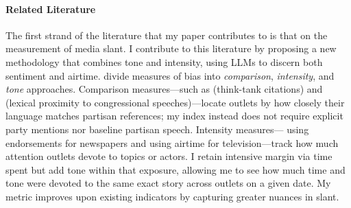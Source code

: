 \documentclass[12pt]{article}
\begin{document}

\paragraph{Related Literature}


The first strand of the literature that my paper contributes to is that on the measurement of media slant. I contribute to this literature by proposing a new methodology that combines tone and intensity, using LLMs to discern both sentiment and airtime.  \citet{puglisi_review} divide measures of bias into  \textit{comparison},  \textit{intensity}, and  \textit{tone} approaches. Comparison measures—such as \citet{milyo_measure} (think-tank citations) and \citet{gentzkow2010media} (lexical proximity to congressional speeches)—locate outlets by how closely their language matches partisan references; my index instead does not require explicit party mentions nor baseline partisan speech. Intensity measures—\citet{ChiangKnight2011} using endorsements for newspapers and \citet{durante2012partisan,CageHengelHerveUrvoy2022} using airtime for television—track how much attention outlets devote to topics or actors. I retain intensive margin via time spent but add tone within that exposure, allowing me to see how much time and tone were devoted to the same exact story across outlets on a given date. My metric improves upon existing indicators by capturing greater nuances in slant.
\end{document}
